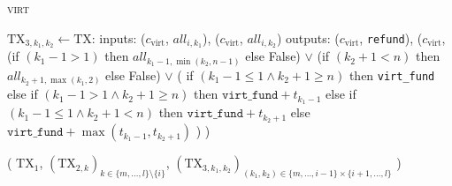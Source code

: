 \begin{center}
\begin{processbox}{\textsc{virt}}
\begin{algorithmic}[1]
          \State $\mathrm{TX}_{3, k_1, k_2} \gets \mathrm{TX}$:
          \Indent
            \State inputs:
            \Indent
              \State ($c_{\mathrm{virt}}$, $\mathit{all}_{i, k_1}$),
              \label{code:virtual-layer:mid-txs:merge-intervals:left-virt-input}
              \State ($c_{\mathrm{virt}}$, $\mathit{all}_{i, k_2}$)
            \EndIndent
            \State outputs:
            \Indent
              \State ($c_{\mathrm{virt}}$, \texttt{refund}),
              \State ($c_{\mathrm{virt}}$,
              \Indent
                \State (if $(k_1-1 > 1)$ then $\mathit{all}_{k_1-1, \min{(k_2,
                n-1)}}$ else False)
                \State $\vee$ (if $(k_2+1 < n)$ then $\mathit{all}_{k_2+1,
                \max{(k_1, 2)}}$ else False)
                \State $\vee$ (
                \Indent
                  \State if $(k_1-1 \leq 1 \wedge k_2+1 \geq n)$ then
                  \texttt{virt\_fund}
                  \State else if $(k_1-1 > 1 \wedge k_2+1 \geq n)$ then
                  $\texttt{virt\_fund} + t_{k_1-1}$
                  \State else if $(k_1-1 \leq 1 \wedge k_2+1 < n)$ then
                  $\texttt{virt\_fund} + t_{k_2+1}$
                  \State else 
                  \Indent
                    \State $\texttt{virt\_fund} + \max{(t_{k_1-1}, t_{k_2+1})}$
                  \EndIndent
                \EndIndent
                \State )
              \EndIndent
              \State )
            \EndIndent
          \EndIndent
        \EndFor

        \State \Return (
        \Indent
          \State $\mathrm{TX}_1$,
          \State $(\mathrm{TX}_{2, k})_{k \in \{m, \dots, l\} \setminus \{i\}}$,
          \State $(\mathrm{TX}_{3, k_1, k_2})_{(k_1, k_2) \in \{m, \dots, i-1\}
          \times \{i+1, \dots, l\}}$
        \EndIndent
        \State )
      \EndIndent
    \end{algorithmic}
  \end{processbox}
  \label{code:virtual-layer:mid-txs}
\end{center} \ \\

